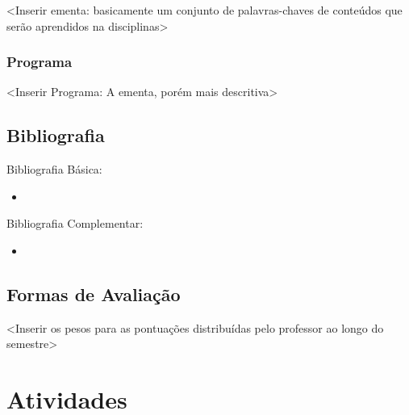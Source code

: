 \documentclass[12pt, a4paper]{article}
\begin{document}
<Inserir ementa: basicamente um conjunto de palavras-chaves de conteúdos que serão aprendidos na disciplinas>

\subsubsection{Programa} \label{subsubsec:programa}

<Inserir Programa: A ementa, porém mais descritiva>

\subsection{Bibliografia} \label{subsec:bibliografia}




Bibliografia Básica:

\begin{itemize}
    \item <Inserir bibliografia básica>
\end{itemize}

Bibliografia Complementar:

\begin{itemize}
    \item <Inserir bibliografia complementar>
\end{itemize}

\subsection{Formas de Avaliação} \label{subsec:avaliacoes}

<Inserir os pesos para as pontuações distribuídas pelo professor ao longo do semestre>


\section{Atividades} \label{sec:atividades}
\end{document}
